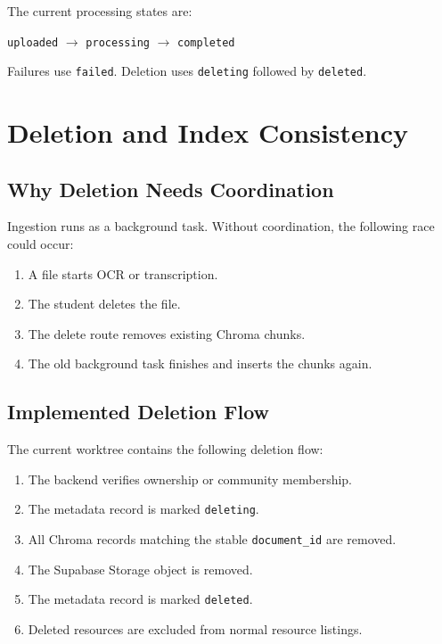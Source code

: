\documentclass[11pt,a4paper]{article}
\begin{document}
The current processing states are:

\begin{center}
\texttt{uploaded} $\rightarrow$ \texttt{processing} $\rightarrow$
\texttt{completed}
\end{center}

Failures use \texttt{failed}. Deletion uses \texttt{deleting} followed by
\texttt{deleted}.

\section{Deletion and Index Consistency}

\subsection{Why Deletion Needs Coordination}

Ingestion runs as a background task. Without coordination, the following race
could occur:

\begin{enumerate}[leftmargin=*]
  \item A file starts OCR or transcription.
  \item The student deletes the file.
  \item The delete route removes existing Chroma chunks.
  \item The old background task finishes and inserts the chunks again.
\end{enumerate}

\subsection{Implemented Deletion Flow}

The current worktree contains the following deletion flow:

\begin{enumerate}[leftmargin=*]
  \item The backend verifies ownership or community membership.
  \item The metadata record is marked \texttt{deleting}.
  \item All Chroma records matching the stable \texttt{document\_id} are
        removed.
  \item The Supabase Storage object is removed.
  \item The metadata record is marked \texttt{deleted}.
  \item Deleted resources are excluded from normal resource listings.
\end{enumerate}
\end{document}
